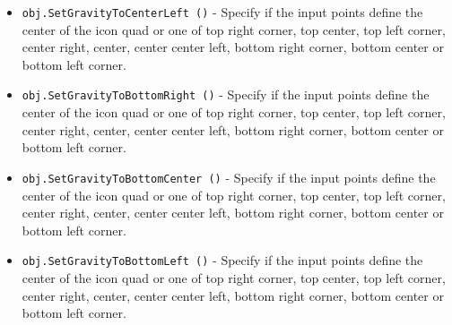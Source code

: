 \begin{itemize}
\item  \verb|obj.SetGravityToCenterLeft ()| -  Specify if the input points define the center of the icon quad or one of
 top right corner, top center, top left corner, center right, center, center
 center left, bottom right corner, bottom center or bottom left corner.

\item  \verb|obj.SetGravityToBottomRight ()| -  Specify if the input points define the center of the icon quad or one of
 top right corner, top center, top left corner, center right, center, center
 center left, bottom right corner, bottom center or bottom left corner.

\item  \verb|obj.SetGravityToBottomCenter ()| -  Specify if the input points define the center of the icon quad or one of
 top right corner, top center, top left corner, center right, center, center
 center left, bottom right corner, bottom center or bottom left corner.

\item  \verb|obj.SetGravityToBottomLeft ()| -  Specify if the input points define the center of the icon quad or one of
 top right corner, top center, top left corner, center right, center, center
 center left, bottom right corner, bottom center or bottom left corner.

\end{itemize}
